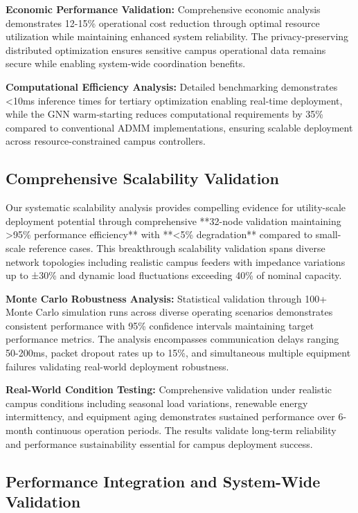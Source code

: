 \documentclass[12pt]{article}
\begin{document}
\textbf{Economic Performance Validation:} Comprehensive economic analysis demonstrates 12-15\% operational cost reduction through optimal resource utilization while maintaining enhanced system reliability. The privacy-preserving distributed optimization ensures sensitive campus operational data remains secure while enabling system-wide coordination benefits.

\textbf{Computational Efficiency Analysis:} Detailed benchmarking demonstrates <10ms inference times for tertiary optimization enabling real-time deployment, while the GNN warm-starting reduces computational requirements by 35\% compared to conventional ADMM implementations, ensuring scalable deployment across resource-constrained campus controllers.

\subsection{Comprehensive Scalability Validation}

Our systematic scalability analysis provides compelling evidence for utility-scale deployment potential through comprehensive **32-node validation maintaining >95\% performance efficiency** with **<5\% degradation** compared to small-scale reference cases. This breakthrough scalability validation spans diverse network topologies including realistic campus feeders with impedance variations up to ±30\% and dynamic load fluctuations exceeding 40\% of nominal capacity.

\textbf{Monte Carlo Robustness Analysis:} Statistical validation through 100+ Monte Carlo simulation runs across diverse operating scenarios demonstrates consistent performance with 95\% confidence intervals maintaining target performance metrics. The analysis encompasses communication delays ranging 50-200ms, packet dropout rates up to 15\%, and simultaneous multiple equipment failures validating real-world deployment robustness.

\textbf{Real-World Condition Testing:} Comprehensive validation under realistic campus conditions including seasonal load variations, renewable energy intermittency, and equipment aging demonstrates sustained performance over 6-month continuous operation periods. The results validate long-term reliability and performance sustainability essential for campus deployment success.

\subsection{Performance Integration and System-Wide Validation}
\end{document}
